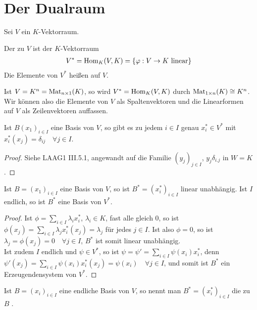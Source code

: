 \section{Der Dualraum}

Sei $V$ ein $K$-Vektorraum.

\begin{definition}[Dualraum]
	Der  zu $V$ ist der $K$-Vektorraum
	\begin{align}
		V^*=\operatorname{Hom}_K(V,K)=\{\varphi:V\to K\text{ linear}\}\notag
	\end{align}
	Die Elemente von $V^*$ heißen  auf $V$.
\end{definition}

\begin{example}
	Ist $V=K^n=\operatorname{Mat}_{n\times 1}(K)$, so wird $V^*=\operatorname{Hom}_K(V,K)$ durch $\operatorname{Mat}_{1\times n}(K)\cong K^n$. Wir können also die Elemente von $V$ als Spaltenvektoren und die Linearformen auf $V$ als Zeilenvektoren auffassen.
\end{example}

\begin{lemma}
	Ist $B(x_1)_{i\in I}$ eine Basis von $V$, so gibt es zu jedem $i\in I$ genau $x_i^*\in V^*$ mit $x_i^*(x_j)=\delta_{ij}\quad\forall j\in I$.
\end{lemma}
\begin{proof}
	Siehe LAAG1 III.5.1, angewandt auf die Familie $(y_j)_{j\in I}$, $y_j\delta_{i.j}$ in $W=K$. %
\end{proof}

\begin{proposition}
	Ist $B=(x_1)_{i\in I}$ eine Basis von $V$, so ist $B^*=(x_i^*)_{i\in I}$ linear unabhängig. Ist $I$ endlich, so ist $B^*$ eine Basis von $V^*$.
\end{proposition}
\begin{proof}
	Ist $\phi=\sum_{i\in I} \lambda_ix_i^*$, $\lambda_i\in K$, fast alle gleich 0, so ist $\phi(x_j)=\sum_{i\in I} \lambda_j x_i^*(x_j)=\lambda_j$ für jedes $j\in I$. Ist also $\phi=0$, so ist $\lambda_j=\phi(x_j)=0\quad\forall j\in I$, $B^*$ ist somit linear unabhängig. \\
	Ist zudem $I$ endlich und $\psi\in V^*$, so ist $\psi=\psi'=\sum_{i\in I} \psi(x_i)x_i^*$, denn $\psi'(x_j)=\sum_{i\in I} \psi(x_i)x_i^*(x_j)=\psi(x_i)\quad\forall j\in I$, und somit ist $B^*$ ein Erzeugendensystem von $V^*$.
\end{proof}

\begin{definition}
	Ist $B=(x_i)_{i\in I}$ eine endliche Basis von $V$, so nennt man $B^*=(x_i^*)_{i\in I}$ die zu $B$ .
\end{definition}

